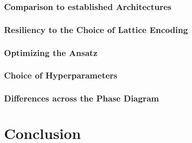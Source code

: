 \documentclass[
headings=optiontohead,              %
12pt,                               %
DIV=13,                             %
twoside=false,                      %
open=right,                         %
BCOR=10mm,                          %
toc=bibliographynumbered            %
]{scrreport}
\begin{document}
        \subsection{Comparison to established Architectures}
        \subsection{Resiliency to the Choice of Lattice Encoding}
        \subsection{Optimizing the Ansatz}
        \subsection{Choice of Hyperparameters}
        \subsection{Differences across the Phase Diagram}

\chapter{Conclusion}



\end{document}
